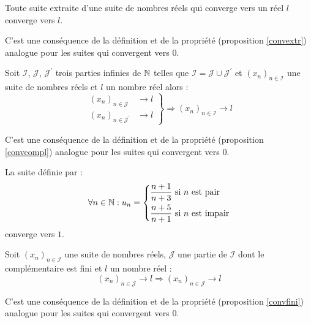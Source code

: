 \begin{propn}
Toute suite extraite d'une suite de nombres réels qui converge vers un réel $l$ converge vers $l$.
\end{propn}
\begin{demo}
C'est une conséquence de la définition et de la propriété (proposition \ref{convextr}) analogue pour les suites qui convergent vers $0$.  
\end{demo}

\begin{propn}
 Soit $\mathcal I$, $\mathcal J$, $\mathcal J^\prime$ trois parties infinies de $\mathbb{N}$ telles que $\mathcal I = \mathcal J \cup \mathcal J^\prime$ et $(x_n)_{n\in \mathcal I}$ une suite de nombres réels et $l$ un nombre réel alors :
\begin{displaymath}
 \left. 
\begin{aligned}
 (x_n)_{n\in \mathcal J} &\rightarrow l \\
 (x_n)_{n\in \mathcal J^\prime} &\rightarrow l
\end{aligned}
\right\rbrace 
\Rightarrow (x_n)_{n\in \mathcal I} \rightarrow l
\end{displaymath}
\end{propn}
\begin{demo}
C'est une conséquence de la définition et de la propriété (proposition \ref{convcompl}) analogue pour les suites qui convergent vers $0$.  
\end{demo}

\begin{exple}
 La suite définie par :
\begin{displaymath}
 \forall n \in \mathbb{N} : u_n =
\left\lbrace
\begin{aligned}
 \dfrac{n+1}{n+3} &\text{ si $n$ est pair}\\
\dfrac{n+5}{n+1} &\text{ si $n$ est impair}
\end{aligned}
\right.  
\end{displaymath}
converge vers $1$.
\end{exple}

\begin{propn}
 Soit $(x_n)_{n\in \mathcal I}$ une suite de nombres réels, $\mathcal J$ une partie de $\mathcal I$ dont le complémentaire est fini et $l$ un nombre réel :
\begin{displaymath}
 (x_n)_{n\in \mathcal J} \rightarrow l \Rightarrow (x_n)_{n\in \mathcal J} \rightarrow l
\end{displaymath}
\end{propn}
\begin{demo}
C'est une conséquence de la définition et de la propriété (proposition \ref{convfini}) analogue pour les suites qui convergent vers $0$.  
\end{demo}

